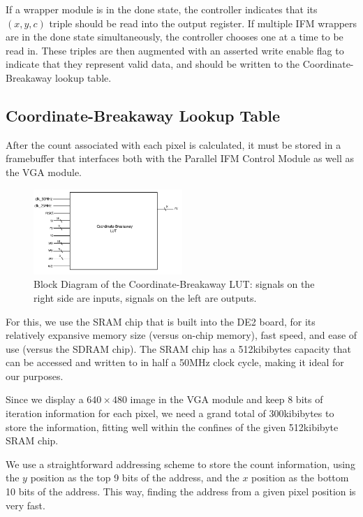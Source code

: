 \documentclass{article}
\begin{document}
If a wrapper module is in the done state, the controller indicates
that its $(x, y, c)$ triple should be read into the output
register. If multiple IFM wrappers are in the done state
simultaneously, the controller chooses one at a time to be read
in. These triples are then augmented with an asserted write enable
flag to indicate that they represent valid data, and should be written
to the Coordinate-Breakaway lookup table.


\subsection{Coordinate-Breakaway Lookup Table}

After the count associated with each pixel is calculated, it must be
stored in a framebuffer that interfaces both with the Parallel IFM
Control Module as well as the VGA module.

\begin{figure}[H]
  \centering
    \includegraphics[width=160pt]{block_diagrams/clut.pdf}
  \caption{Block Diagram of the Coordinate-Breakaway LUT: signals on
    the right side are inputs, signals on the left are outputs.}
\end{figure}

For this, we use the SRAM chip that is built into the DE2 board, for
its relatively expansive memory size (versus on-chip memory), fast
speed, and ease of use (versus the SDRAM chip). The SRAM chip has a 
512kibibytes capacity that can be accessed and written to in half a 50MHz
clock cycle, making it ideal for our purposes.

Since we display a $640\times 480$ image in the VGA module and keep 8
bits of iteration information for each pixel, we need a grand total of
300kibibytes to store the information, fitting well within the
confines of the given 512kibibyte SRAM chip.

We use a straightforward addressing scheme to store the count
information, using the $y$ position as the top 9 bits of the address,
and the $x$ position as the bottom 10 bits of the address. This way,
finding the address from a given pixel position is very fast.
\end{document}
